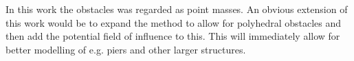 \documentclass[a4paper,conference]{IEEEtran}
\begin{document}
In this work the obstacles was regarded as point masses. An obvious extension of this work would be to expand the method to allow for polyhedral obstacles and then add the potential field of influence to this. This will immediately allow for better modelling of e.g. piers and other larger structures. 


 

\end{document}
